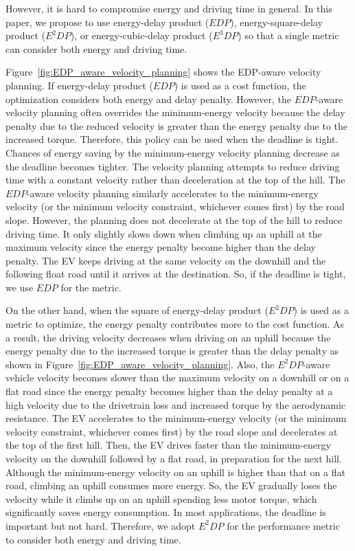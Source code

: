\documentclass{IEEEtran}
\begin{document}
However, it is hard to compromise energy and driving time in general. In this paper, we propose to use energy-delay product ($EDP$), energy-square-delay product ($E^2DP$), or energy-cubic-delay product ($E^3DP$) so that a single metric can consider both energy and driving time. 

Figure~\ref{fig:EDP_aware_velocity_planning} shows the EDP-aware velocity planning. 
If energy-delay product ($EDP$) is used as a cost function, the optimization considers both energy and delay penalty. However, the $EDP$-aware velocity planning often overrides the minimum-energy velocity because the delay penalty due to the reduced velocity is greater than the energy penalty due to the increased torque. Therefore, this policy can be used when the deadline is tight. Chances of energy saving by the minimum-energy velocity planning decrease as the deadline becomes tighter. 
The velocity planning attempts to reduce driving time with a constant velocity rather than deceleration at the top of the hill. 
%
The $EDP$-aware velocity planning similarly accelerates to the minimum-energy velocity (or the minimum velocity constraint, whichever comes first) by the road slope. However, the planning does not decelerate at the top of the hill to reduce driving time. It only slightly slows down when climbing up an uphill at the maximum velocity since the energy penalty become higher than the delay penalty. The EV keeps driving at the same velocity on the downhill and the following float road until it arrives at the destination. So, if the deadline is tight, we use $EDP$ for the metric.

On the other hand, when the square of energy-delay product ($E^2DP$) is used as a metric to optimize, the energy penalty contributes more to the cost function. As a result, the driving velocity decreases when driving on an uphill because the energy penalty due to the increased torque is greater than the delay penalty as shown in Figure~\ref{fig:EDP_aware_velocity_planning}. Also, the $E^2DP$-aware vehicle velocity becomes slower than the maximum velocity on a downhill or on a flat road since the energy penalty becomes higher than the delay penalty at a high velocity due to the drivetrain loss and increased torque by the aerodynamic resistance. The EV accelerates to the minimum-energy velocity (or the minimum velocity constraint, whichever comes first) by the road slope and decelerates at the top of the first hill. Then, the EV drives faster than the minimum-energy velocity on the downhill followed by a  flat road, in preparation for the next hill. Although the minimum-energy velocity on an uphill is higher than that on a flat road, climbing an uphill consumes more energy. So, the EV gradually loses the velocity while it climbs up on an uphill spending less motor torque, which significantly saves energy consumption. In most applications, the deadline is important but not hard. Therefore, we adopt $E^2DP$ for the performance metric to consider both energy and driving time.
\end{document}
